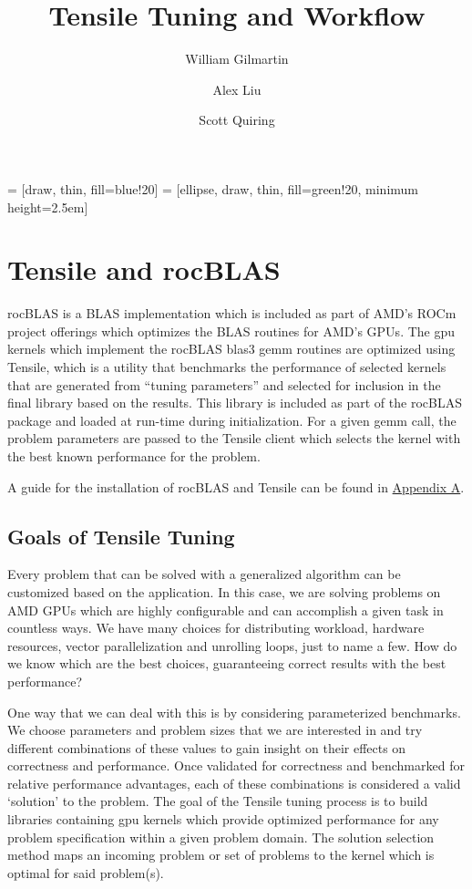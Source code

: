 \documentclass[]{article}
\title{Tensile Tuning and Workflow}
\author{William Gilmartin \and Alex Liu \and Scott Quiring}
\begin{document}
\maketitle

\newpage

\tableofcontents



 = [draw, thin, fill=blue!20]
 = [ellipse, draw, thin, fill=green!20, minimum height=2.5em]

\section{Tensile and rocBLAS}


rocBLAS is a BLAS implementation which is included as part of AMD's ROCm project offerings which optimizes the BLAS routines for AMD's GPUs. The gpu kernels which implement the rocBLAS blas3 gemm routines are optimized using Tensile, which is a utility that benchmarks the performance of selected kernels that are generated from ``tuning parameters'' and selected for inclusion in the final library based on the results. This library is included as part of the rocBLAS package and loaded at run-time during initialization. For a given gemm call, the problem parameters are passed to the Tensile client which selects the kernel with the best known performance for the problem.
 

A guide for the installation of rocBLAS and Tensile can be found in \hyperref[sec:appendixA]{Appendix A}.

\subsection{Goals of Tensile Tuning}

Every problem that can be solved with a generalized algorithm can be customized based on the application. In this case, we are solving problems on AMD GPUs which are highly configurable and can accomplish a given task in countless ways. We have many choices for distributing workload, hardware resources, vector parallelization and unrolling loops, just to name a few. How do we know which are the best choices, guaranteeing correct results with the best performance?

One way that we can deal with this is by considering parameterized benchmarks. We choose parameters and problem sizes that we are interested in and try different combinations of these values to gain insight on their effects on correctness and performance. Once validated for correctness and benchmarked for relative performance advantages, each of these combinations is considered a valid `solution' to the problem. The goal of the Tensile tuning process is to build libraries containing gpu kernels which provide optimized performance for any problem specification within a given problem domain. The solution selection method maps an incoming problem or set of problems to the kernel which is optimal for said problem(s).
\end{document}
